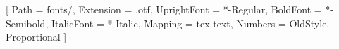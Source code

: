 \newcommand\nobrkhyph{\mbox{-}}

\newcommand{\I}{\textrm{\scshape i}\xspace}
\newcommand{\II}{\textrm{\scshape ii}\xspace}
\newcommand{\III}{\textrm{\scshape iii}\xspace}
\newcommand{\IV}{\textrm{\scshape iv}\xspace}
\newcommand{\V}{\textrm{\scshape v}\xspace}
\newcommand{\VI}{\textrm{\scshape vi}\xspace}
\newcommand{\VII}{\textrm{\scshape vii}\xspace}
\newcommand{\VIII}{\textrm{\scshape viii}\xspace}
\newcommand{\IX}{\textrm{\scshape ix}\xspace}
\newcommand{\X}{\textrm{\scshape x}\xspace}
\newcommand{\ISBN}{\textrm{\scshape isbn}\xspace}
\newcommand{\ISSN}{\textrm{\scshape issn}\xspace}

\usepackage{tocloft}
\setlength{\cftbeforepartskip}{5.0mm}
\setlength{\cftbeforechapskip}{2.0mm}
\setlength{\cftbeforesecskip}{0.0mm}

\usepackage{pageslts}

\usepackage{ifxetex}


\ifxetex
	\usepackage[no-math]{fontspec}
	\usepackage{xunicode}
	\usepackage{xltxtra}
         \setmainfont{AGaramondPro}[
        Path = fonts/,
        Extension = .otf,
        UprightFont = *-Regular,
        BoldFont = *-Semibold,
        ItalicFont = *-Italic,
        Mapping = tex-text,
        Numbers = {OldStyle, Proportional}
        ]
\else
	 \usepackage[utf8]{inputenc}
\fi

